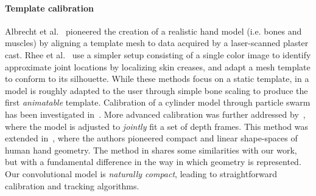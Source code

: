 
\paragraph{Template calibration}
Albrecht et al.~ pioneered the creation of a realistic hand model (i.e. bones and muscles) by aligning a template mesh to data acquired by a laser-scanned plaster cast. Rhee et al.~ use a simpler setup consisting of a single color image to identify approximate joint locations by localizing skin creases, and adapt a mesh template to conform to its silhouette. While these methods focus on a static template, in \cite{delagorce2011model} a model is roughly adapted to the user through simple bone scaling to produce the first \emph{animatable} template. 
% 
Calibration of a cylinder model through particle swarm has been investigated in~\cite{makris2015adapt}.
% 
More advanced calibration was further addressed by~\cite{taylor2014user}, where the model is adjusted to \emph{jointly} fit a set of depth frames. This method was extended in~\cite{khamis15learning}, where the authors pioneered compact and linear shape-spaces of human hand geometry.
% 
The method in \cite{taylor2014user} shares some similarities with our work, but with a fundamental difference in the way in which geometry is represented. Our convolutional model is \emph{naturally compact}, leading to straightforward calibration and tracking algorithms.

